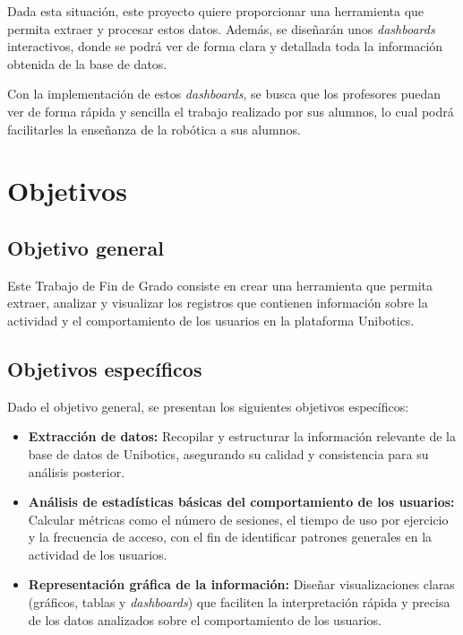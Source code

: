 \documentclass[a4paper, 12pt]{book}
\begin{document}
Dada esta situación, este proyecto quiere proporcionar una herramienta que permita extraer y procesar estos datos. Además, se diseñarán unos \textit{dashboards} interactivos, donde se podrá ver de forma clara y detallada toda la información obtenida de la base de datos.

Con la implementación de estos \textit{dashboards}, se busca que los profesores puedan ver de forma rápida y sencilla el trabajo realizado por sus alumnos, lo cual podrá facilitarles la enseñanza de la robótica a sus alumnos.


\section{Objetivos}
\label{sec:seccion}

\subsection{Objetivo general}
\label{sec:objetivo-general}

Este Trabajo de Fin de Grado consiste en crear una herramienta que permita extraer, analizar y visualizar los registros que contienen información sobre la actividad y el comportamiento de los usuarios en la plataforma Unibotics.

\subsection{Objetivos específicos}
\label{sec:objetivos-especificos}

Dado el objetivo general, se presentan los siguientes objetivos específicos:

\begin{itemize}
    \item \textbf{Extracción de datos:} Recopilar y estructurar la información relevante de la base de datos de Unibotics, asegurando su calidad y consistencia para su análisis posterior.
    
    \item \textbf{Análisis de estadísticas básicas del comportamiento de los usuarios:} Calcular métricas como el número de sesiones, el tiempo de uso por ejercicio y la frecuencia de acceso, con el fin de identificar patrones generales en la actividad de los usuarios.
    
    \item \textbf{Representación gráfica de la información:} Diseñar visualizaciones claras (gráficos, tablas y \textit{dashboards}) que faciliten la interpretación rápida y precisa de los datos analizados sobre el comportamiento de los usuarios.
\end{itemize}
\end{document}
